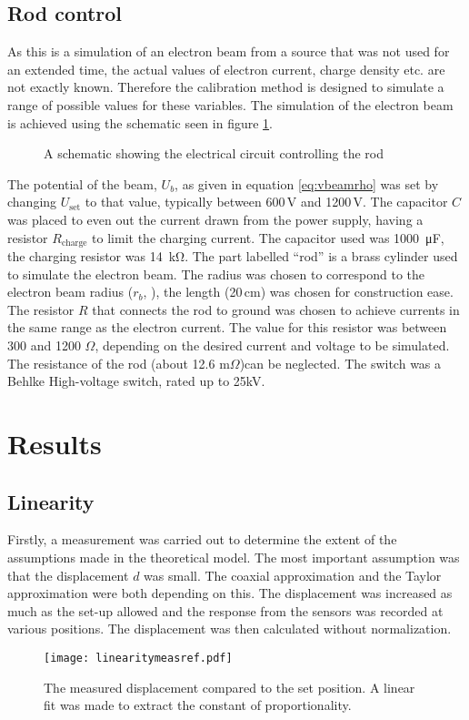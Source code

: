 \subsection{Rod control}
As this is a simulation of an electron beam from a source that was not used for an extended time, the actual values of electron current, charge density etc. are not exactly known. Therefore the calibration method is designed to simulate a range of possible values for these variables. 
The simulation of the electron beam is achieved using the schematic seen in figure \ref{fig:circuitsetup}. 

\begin{figure}[h]
\centering

\caption{A schematic showing the electrical circuit controlling the rod}
\label{fig:circuitsetup}
\end{figure}

The potential of the beam, $U_b$, as given in equation \ref{eq:vbeamrho} was set by changing $U_\text{set}$ to that value, typically between 600\,V and 1200\,V. The capacitor $C$ was placed to even out the current drawn from the power supply, having a resistor $R_\text{charge}$ to limit the charging current. The capacitor used was \SI{1000}{\micro\farad}, the charging resistor was \SI{14}{\kilo\ohm}.
The part labelled ``rod'' is a brass cylinder used to simulate the electron beam. The radius was chosen to correspond to the electron beam radius ($r_b$, ), the length (20\,cm) was chosen for construction ease.
The resistor $R$ that connects the rod to ground was chosen to achieve currents in the same range as the electron current. The value for this resistor was between 300 and 1200 $\Omega$, depending on the desired current and voltage to be simulated. The resistance of the rod (about 12.6 m$\Omega$)can be neglected.
The switch was a Behlke High-voltage switch, rated up to 25kV.

\section{Results}

\subsection{Linearity}
Firstly, a measurement was carried out to determine the extent of the assumptions made in the theoretical model. The most important assumption was that the displacement $d$ was small. The coaxial approximation and the Taylor approximation were both depending on this. The displacement was increased as much as the set-up allowed and the response from the sensors was recorded at various positions. The displacement was then calculated without normalization. 
\begin{figure}[h]
\centering
\texttt{[image: linearitymeasref.pdf]}
\caption{The measured displacement compared to the set position. A linear fit was made to extract the constant of proportionality.}
\label{fig:linearitymeas}
\end{figure}


